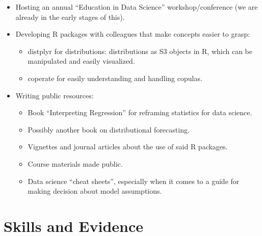 \documentclass[]{book}
\providecommand{\tightlist}{%
  \setlength{\itemsep}{0pt}\setlength{\parskip}{0pt}}
\begin{document}
\begin{itemize}
\tightlist
\item
  Hosting an annual ``Education in Data Science'' workshop/conference (we are already in the early stages of this).
\item
  Developing R packages with colleagues that make concepts easier to grasp:

  \begin{itemize}
  \tightlist
  \item
    distplyr for distributions: distributions as S3 objects in R, which can be manipulated and easily visualized.
  \item
    coperate for easily understanding and handling copulas.
  \end{itemize}
\item
  Writing public resources:

  \begin{itemize}
  \tightlist
  \item
    Book ``Interpreting Regression'' for reframing statistics for data science.
  \item
    Possibly another book on distributional forecasting.
  \item
    Vignettes and journal articles about the use of said R packages.
  \item
    Course materials made public.
  \item
    Data science ``cheat sheets'', especially when it comes to a guide for making decision about model assumptions.
  \end{itemize}
\end{itemize}

\hypertarget{skills-and-evidence}{%
\section{Skills and Evidence}\label{skills-and-evidence}}
\end{document}
